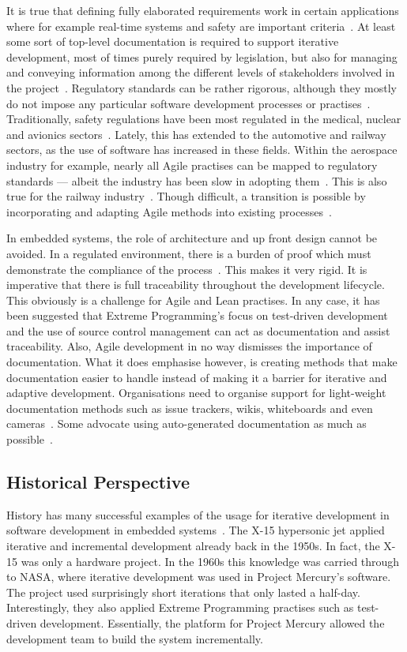 \documentclass[english]{tktltiki2}
\begin{document}
It is true that defining fully elaborated requirements work in certain applications where for example real-time systems and safety are important criteria~\cite{Boe88, KRM13}. At least some sort of top-level documentation is required to support iterative development, most of times purely required by legislation, but also for managing and conveying information among the different levels of stakeholders involved in the project~\cite{KRM13, EHS14}. Regulatory standards can be rather rigorous, although they mostly do not impose any particular software development processes or practises~\cite{CWR10}. Traditionally, safety regulations have been most regulated in the medical, nuclear and avionics sectors~\cite{JLP12}. Lately, this has extended to the automotive and railway sectors, as the use of software has increased in these fields. Within the aerospace industry for example, nearly all Agile practises can be mapped to regulatory standards — albeit the industry has been slow in adopting them~\cite{VB09, CWR10}. This is also true for the railway industry~\cite{JLP12}. Though difficult, a transition is possible by incorporating and adapting Agile methods into existing processes~\cite{VB09}.

In embedded systems, the role of architecture and up front design cannot be avoided. In a regulated environment, there is a burden of proof which must demonstrate the compliance of the process~\cite{CWR10}. This makes it very rigid. It is imperative that there is full traceability throughout the development lifecycle. This obviously is a challenge for Agile and Lean practises. In any case, it has been suggested that Extreme Programming’s focus on test-driven development and the use of source control management can act as documentation and assist traceability. Also, Agile development in no way dismisses the importance of documentation. What it does emphasise however, is creating methods that make documentation easier to handle instead of making it a barrier for iterative and adaptive development. Organisations need to organise support for light-weight documentation methods such as issue trackers, wikis, whiteboards and even cameras~\cite{HMP12}. Some advocate using auto-generated documentation as much as possible~\cite{VB09, JLP12}.

\subsection{Historical Perspective}

History has many successful examples of the usage for iterative development in software development in embedded systems~\cite{LB03}. The X-15 hypersonic jet applied iterative and incremental development already back in the 1950s. In fact, the X-15 was only a hardware project. In the 1960s this knowledge was carried through to NASA, where iterative development was used in Project Mercury’s software. The project used surprisingly short iterations that only lasted a half-day. Interestingly, they also applied Extreme Programming practises such as test-driven development. Essentially, the platform for Project Mercury allowed the development team to build the system incrementally.
\end{document}
